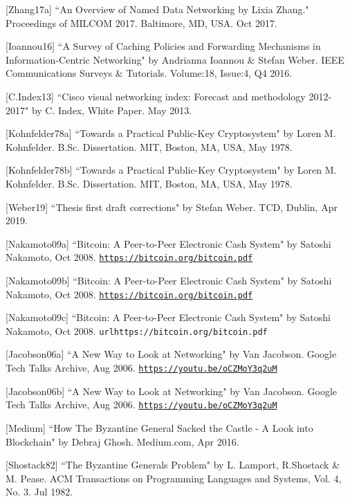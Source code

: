 

[Zhang17a] ``An Overview of Named Data Networking by Lixia Zhang." Proceedings of
MILCOM 2017. Baltimore, MD, USA. Oct 2017.

[Ioannou16] ``A Survey of Caching Policies and Forwarding Mechanisms in Information-Centric Networking" by Andrianna Ioannou \& Stefan Weber. IEEE Communications Surveys \& Tutorials. Volume:18, Issue:4, Q4 2016.

[C.Index13] ``Cisco visual networking index: Forecast and methodology 2012-2017" by C. Index, White Paper. May 2013.


[Kohnfelder78a] ``Towards a Practical Public-Key Cryptosystem" by Loren M. Kohnfelder. B.Sc. Dissertation. MIT, Boston, MA, USA, May 1978.

[Kohnfelder78b] ``Towards a Practical Public-Key Cryptosystem" by Loren M. Kohnfelder. B.Sc. Dissertation. MIT, Boston, MA, USA, May 1978.

[Weber19] ``Thesis first draft corrections" by Stefan Weber. TCD, Dublin, Apr 2019.

[Nakamoto09a] ``Bitcoin: A Peer-to-Peer Electronic Cash System" by Satoshi Nakamoto, Oct 2008.  \texttt{\url{https://bitcoin.org/bitcoin.pdf}}

[Nakamoto09b] ``Bitcoin: A Peer-to-Peer Electronic Cash System" by Satoshi Nakamoto, Oct 2008.  \texttt{\url{https://bitcoin.org/bitcoin.pdf}}


[Nakamoto09c] ``Bitcoin: A Peer-to-Peer Electronic Cash System" by Satoshi Nakamoto, Oct 2008.  \texttt{url{https://bitcoin.org/bitcoin.pdf}}



[Jacobson06a] ``A New Way to Look at Networking" by Van Jacobson. Google Tech Talks Archive, Aug 2006. \texttt{\url{https://youtu.be/oCZMoY3q2uM}}

[Jacobson06b]  ``A New Way to Look at Networking" by Van Jacobson. Google Tech Talks Archive, Aug 2006. \texttt{\url{https://youtu.be/oCZMoY3q2uM}}


[Medium] ``How The Byzantine General Sacked the Castle - A Look into Blockchain" by Debraj Ghosh. Medium.com, Apr 2016.


[Shostack82] ``The Byzantine Generals Problem" by L. Lamport, R.Shostack \& M. Pease. ACM Transactions on Programming Languages and Systems, Vol. 4, No. 3. Jul 1982.


